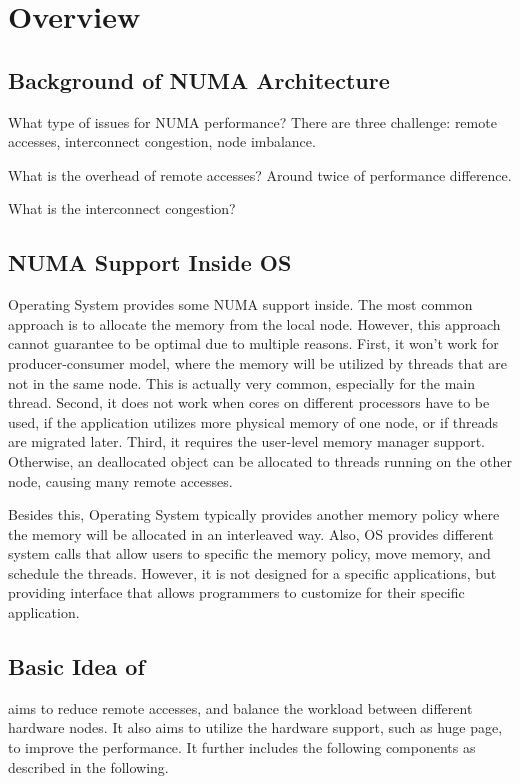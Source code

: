 \section{Overview}
\label{sec:overview}

\subsection{Background of NUMA Architecture}

What type of issues for NUMA performance? 
There are three challenge: remote accesses, interconnect congestion, node imbalance. 

What is the overhead of remote accesses? Around twice of performance difference. 

What is the interconnect congestion? 

\subsection{NUMA Support Inside OS}

Operating System provides some NUMA support inside. The most common approach is to allocate the memory from the local node. However, this approach cannot guarantee to be optimal due to multiple reasons. First, it won't work for producer-consumer model, where the memory will be utilized by threads that are not in the same node. This is actually very common, especially for the main thread. Second, it does not work when cores on different processors have to be used, if the application utilizes more physical memory of one node, or if threads are migrated later. Third, it requires the user-level memory manager support. Otherwise, an deallocated object can be allocated to threads running on the other node, causing many remote accesses. 

Besides this, Operating System typically provides another memory policy where the memory will be allocated in an interleaved way. Also, OS provides different system calls that allow users to specific the memory policy, move memory, and schedule the threads. However, it is not designed for a specific applications, but providing interface that allows programmers to customize for their specific application.   


\subsection{Basic Idea of \NA{}}
\NA{} aims to reduce remote accesses, and balance the workload between different hardware nodes. It also aims to utilize the hardware support, such as huge page, to improve the performance. It further includes the following components as described in the following. 

